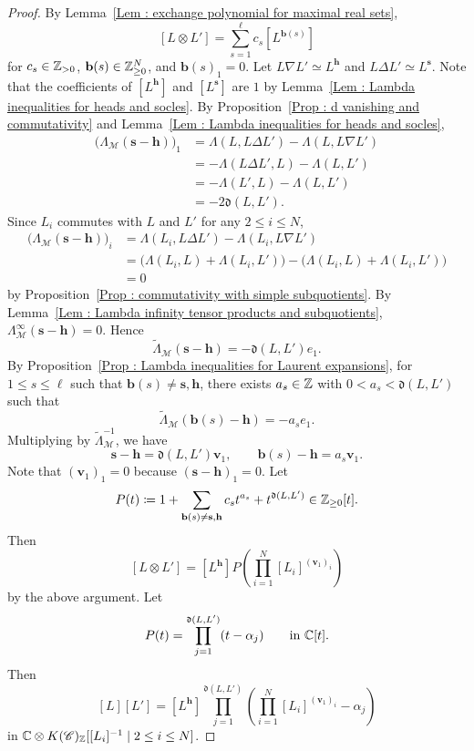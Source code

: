 \begin{proof}
By Lemma~\ref{Lem : exchange polynomial for maximal real sets},
\[
[L \otimes L'] = \sum_{s=1}^{\ell}c_s[L^{\mathbf{b}(s)}]
\]
for $c_s \in \mathbb{Z}_{>0}$, $\mathbf{b}(s) \in \mathbb{Z}_{\geq 0}^N$,
and $\mathbf{b}(s)_1 = 0$.
Let $L \nabla L' \simeq L^{\mathbf{h}}$ and
$L \Delta L' \simeq L^{\mathbf{s}}$.
Note that the coefficients of $[L^{\mathbf{h}}]$ and $[L^{\mathbf{s}}]$
are $1$ by Lemma~\ref{Lem : Lambda inequalities for heads and socles}.
By Proposition~\ref{Prop : d vanishing and commutativity}
and Lemma~\ref{Lem : Lambda inequalities for heads and socles},
\[
\begin{aligned}
\bigl(\Lambda_{\mathcal{M}}(\mathbf{s} - \mathbf{h})\bigr)_1
&= \Lambda(L, L \Delta L') - \Lambda(L, L \nabla L') \\
&= -\Lambda(L \Delta L', L) - \Lambda(L, L') \\
&= -\Lambda(L', L) - \Lambda(L, L') \\
&= -2\mathfrak{d}(L, L').
\end{aligned}
\]
Since $L_i$ commutes with $L$ and $L'$ for any $2 \leq i \leq N$,
\[
\begin{aligned}
\bigl(\Lambda_{\mathcal{M}}(\mathbf{s} - \mathbf{h})\bigr)_i
&= \Lambda(L_i, L \Delta L') - \Lambda(L_i, L \nabla L') \\
&= \bigl(\Lambda(L_i, L) + \Lambda(L_i, L')\bigr)
 - \bigl(\Lambda(L_i, L) + \Lambda(L_i, L')\bigr) \\
&= 0
\end{aligned}
\]
by Proposition~\ref{Prop : commutativity with simple subquotients}.
By Lemma~\ref{Lem : Lambda infinity tensor products and subquotients},
$\Lambda^{\infty}_{\mathcal{M}}(\mathbf{s} - \mathbf{h}) = 0$.
Hence
\[
\widetilde{\Lambda}_{\mathcal{M}}(\mathbf{s} - \mathbf{h})
= -\mathfrak{d}(L, L')e_1.
\]
By Proposition~\ref{Prop : Lambda inequalities for Laurent expansions},
for $1 \leq s \leq \ell$ such that
$\mathbf{b}(s) \neq \mathbf{s}, \mathbf{h}$,
there exists $a_s \in \mathbb{Z}$ with $0 < a_s < \mathfrak{d}(L, L')$
such that
\[
\widetilde{\Lambda}_{\mathcal{M}}(\mathbf{b}(s) - \mathbf{h})
= -a_s e_1.
\]
Multiplying by $\widetilde{\Lambda}_{\mathcal{M}}^{-1}$, we have
\[
\mathbf{s} - \mathbf{h} = \mathfrak{d}(L, L')\mathbf{v}_1,
\qquad
\mathbf{b}(s) - \mathbf{h} = a_s\mathbf{v}_1.
\]
Note that $(\mathbf{v}_1)_1 = 0$
because $(\mathbf{s} - \mathbf{h})_1 = 0$.
Let
\[
P(t) \coloneq 1
+ \sum_{\mathbf{b}(s) \neq \mathbf{s}, \mathbf{h}}c_s t^{a_s}
+ t^{\mathfrak{d}(L, L')}
\in \mathbb{Z}_{\geq 0}[t].
\]
Then
\[
[L \otimes L'] = [L^{\mathbf{h}}]
P\left(\prod_{i=1}^N[L_i]^{(\mathbf{v}_1)_i}\right)
\]
by the above argument.
Let
\[
P(t) = \prod_{j=1}^{\mathfrak{d}(L, L')}(t - \alpha_j)
\qquad \text{in $\mathbb{C}[t]$}.
\]
Then
\[
[L][L'] = [L^{\mathbf{h}}]
\prod_{j=1}^{\mathfrak{d}(L, L')}
\left(\prod_{i=1}^N[L_i]^{(\mathbf{v}_1)_i} - \alpha_j\right)
\]
in $\mathbb{C} \otimes K(\mathscr{C})_{\mathbb{Z}}
[[L_i]^{-1} \mid 2 \leq i \leq N]$.


\end{proof}
